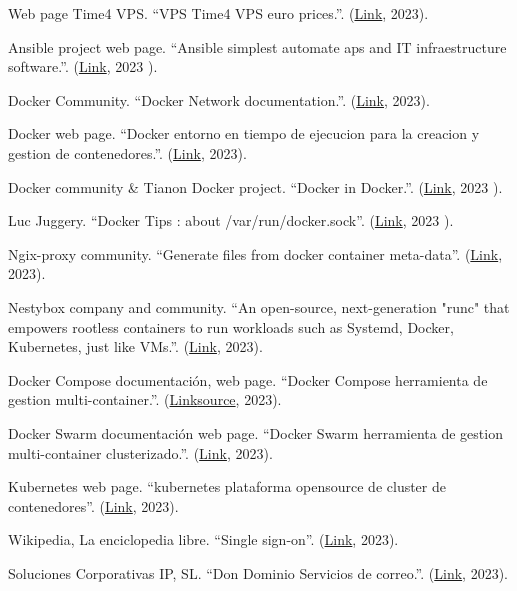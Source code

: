 \documentclass[spanish,final]{setup/eetac_tfc_pfc}
\begin{document}
\begin{thebibliography}{2}
Web page Time4 VPS.
``VPS Time4 VPS euro prices.''.
(\href{https://www.time4vps.com/linux-vps/}{Link}, 2023).

Ansible project web page.
``Ansible simplest automate aps and IT infraestructure software.''.
(\href{https://www.ansible.com/}{Link}, 2023 ).

Docker Community.
``Docker Network documentation.''.
(\href{https://docs.docker.com/network/}{Link}, 2023).

Docker web page.
``Docker entorno en tiempo de ejecucion para la creacion y gestion de contenedores.''.
(\href{https://www.docker.com/}{Link}, 2023).

Docker community \& Tianon Docker project.
``Docker in Docker.''.
(\href{https://hub.docker.com/_/docker}{Link}, 2023 ).

Luc Juggery.
``Docker Tips : about /var/run/docker.sock''.
(\href{https://betterprogramming.pub/about-var-run-docker-sock-3bfd276e12fd}{Link}, 2023 ).

Ngix-proxy community.
``Generate files from docker container meta-data''.
(\href{https://github.com/nginx-proxy/docker-gen}{Link}, 2023).

Nestybox company and community.
``An open-source, next-generation "runc" that empowers rootless containers to run workloads such as Systemd, Docker, Kubernetes, just like VMs.''.
(\href{https://github.com/nestybox/sysbox}{Link}, 2023).

Docker Compose documentación, web page.
``Docker Compose herramienta de gestion multi-container.''.
(\href{https://docs.docker.com/compose/}{Link}\href{https://github.com/docker/compose}{source}, 2023).

Docker Swarm documentación web page.
``Docker Swarm herramienta de gestion multi-container clusterizado.''.
(\href{https://docs.docker.com/engine/swarm/}{Link}, 2023).

Kubernetes web page.
``kubernetes plataforma opensource de cluster de contenedores''.
(\href{https://kubernetes.io/es/}{Link}, 2023).

Wikipedia, La enciclopedia libre.
``Single sign-on''.
(\href{https://en.wikipedia.org/wiki/Single_sign-on}{Link}, 2023).

Soluciones Corporativas IP, SL.
``Don Dominio Servicios de correo.''.
(\href{https://www.dondominio.com/es/products/email/}{Link}, 2023).


\end{thebibliography}
\end{document}
